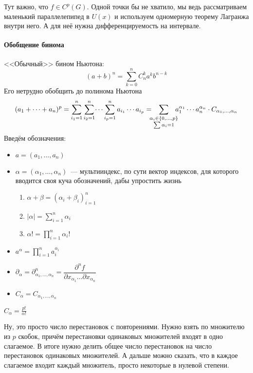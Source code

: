 \documentclass[12pt,timbord]{../../../notes}
\begin{document}
\begin{rem}\label{rem:diffspace::highpartial::permut}
  Тут важно, что $f\in C^p(G)$. Одной точки бы не хватило, мы
  ведь рассматриваем маленький параллелепипед в $U(x)$ и используем одномерную теорему
  Лагранжа внутри него. А для неё нужна дифференцируемость на интервале.
\end{rem}

\paragraph{Обобщение бинома}
\label{par:diffspace::genbinom}
<<Обычный>> бином Ньютона:
\[
  (a+b)^n  = \sum_{k=0}^n C_n^k a^k b^{n-k}
\]
Его нетрудно обобщить до полинома Ньютона
\[
  (a_1 + \dotsb + a_n)^p = \sum_{i_1=1}^n \sum_{i_2=1}^n \dotsi \sum_{i_p=1}^n a_{i_1} \dotsm a_{i_p}
  = \sum_{{\substack{\mathclap{\alpha_i \in \{0, \dotsc, p\}}\\ \sum \alpha_i = 1}}} 
  a_1^{\alpha_1} \dotsm a_n^{\alpha_n} \cdot C_{\alpha_1, \dotsc, \alpha_n} 
\]
Введём обозначения:
\begin{itemize}
  \item $a = (a_1, \dotsc, a_n)$
  \item $\alpha = (\alpha_1, \dotsc, \alpha_n)$~--- мультииндекс, по сути вектор индексов, для
    которого вводится своя куча обозначений, дабы упростить жизнь
    \begin{enumerate}
      \item $\alpha + \beta = (\alpha_i + \beta_i)_{i=1}^n$
      \item $|\alpha| = \sum_{i=1}^n\alpha_i$
      \item $\alpha! = \prod_{i=1}^n\alpha_i!$
    \end{enumerate}
  \item $a^\alpha = \prod_{i=1}^n a_i^{\alpha_i}$
  \item $\partial_\alpha = \partial^n_{\alpha_1, \dotsc, \alpha_n} = \dfrac{\partial^n f}{\partial
    x_{\alpha_1} \dotso \partial x_{\alpha_n}}$
  \item $C_\alpha = C_{\alpha_1, \dotsc, \alpha_n}$
\end{itemize}

\begin{prop}\label{prop:diffspace::genbinom::factors}
  $\displaystyle C_\alpha = \frac{p!}{\alpha!}$
\end{prop}
\begin{itlproof}
  Ну, это просто число перестановок с повторениями. Нужно взять по множителю из $p$ скобок,
  причём перестановки одинаковых множителей входят в одно слагаемое. В итоге нужно делить общее
  число перестановок на число перестановок одинаковых множителей. А дальше можно сказать, что
  в каждое слагаемое входит каждый множитель, просто некоторые в нулевой степени.
\end{itlproof}
\end{document}
